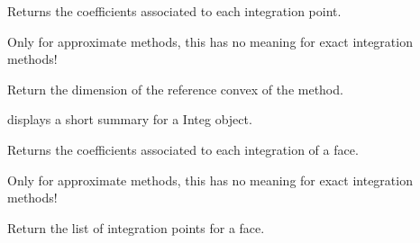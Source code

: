 \documentclass[a4paper,11pt,english]{sphinxmanual}
\begin{document}
\begin{fulllineitems}
\begin{fulllineitems}
\label{\detokenize{python/cmdref_Integ:getfem.Integ.coeffs}}
Returns the coefficients associated to each integration point.

Only for approximate methods, this has no meaning for exact
integration methods!

\end{fulllineitems}


\begin{fulllineitems}
\label{\detokenize{python/cmdref_Integ:getfem.Integ.dim}}
Return the dimension of the reference convex of
the method.

\end{fulllineitems}


\begin{fulllineitems}
\label{\detokenize{python/cmdref_Integ:getfem.Integ.display}}
displays a short summary for a Integ object.

\end{fulllineitems}


\begin{fulllineitems}
\label{\detokenize{python/cmdref_Integ:getfem.Integ.face_coeffs}}
Returns the coefficients associated to each integration of a face.

Only for approximate methods, this has no meaning for exact
integration methods!

\end{fulllineitems}


\begin{fulllineitems}
\label{\detokenize{python/cmdref_Integ:getfem.Integ.face_pts}}
Return the list of integration points for a face.


\end{fulllineitems}
\end{fulllineitems}
\end{document}

